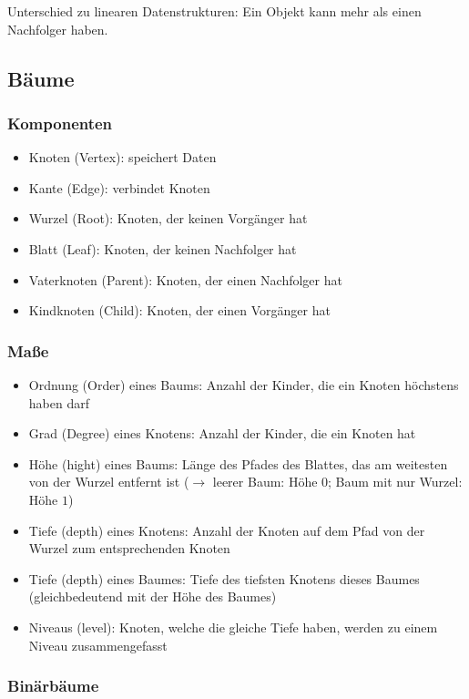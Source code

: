 \documentclass{article}
\begin{document}
	Unterschied zu linearen Datenstrukturen: Ein Objekt kann mehr als einen Nachfolger haben.
	
	\subsection{Bäume}
	
	\subsubsection{Komponenten}
	
	\begin{itemize}
		\item Knoten (Vertex): speichert Daten
		\item Kante (Edge): verbindet Knoten
		\item Wurzel (Root): Knoten, der keinen Vorgänger hat
		\item Blatt (Leaf): Knoten, der keinen Nachfolger hat
		\item Vaterknoten (Parent): Knoten, der einen Nachfolger hat
		\item Kindknoten (Child): Knoten, der einen Vorgänger hat
	\end{itemize}
	
	\subsubsection{Maße}
	
	\begin{itemize}
		\item Ordnung (Order) eines Baums: Anzahl der Kinder, die ein Knoten höchstens haben darf
		\item Grad (Degree) eines Knotens: Anzahl der Kinder, die ein Knoten hat
		\item Höhe (hight) eines Baums: Länge des Pfades des Blattes, das am weitesten von der Wurzel entfernt ist ($\rightarrow$ leerer Baum: Höhe $0$; Baum mit nur Wurzel: Höhe $1$)
		\item Tiefe (depth) eines Knotens: Anzahl der Knoten auf dem Pfad von der Wurzel zum entsprechenden Knoten
		\item Tiefe (depth) eines Baumes: Tiefe des tiefsten Knotens dieses Baumes (gleichbedeutend mit der Höhe des Baumes)
		\item Niveaus (level): Knoten, welche die gleiche Tiefe haben, werden zu einem Niveau zusammengefasst
	\end{itemize}
	
	\subsubsection{Binärbäume}
	
\end{document}

